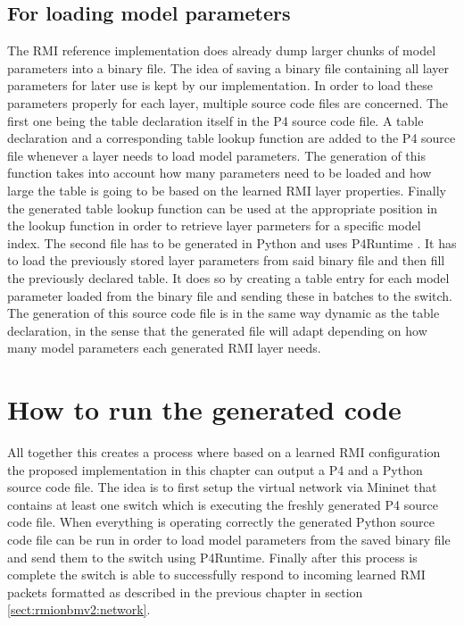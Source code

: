 \subsection{For loading model parameters}
\label{sect:rmiforp4:parameters}
The RMI reference implementation does already dump larger chunks of model parameters into a binary file. The idea of saving a binary file containing all layer parameters for later use is kept by our implementation. In order to load these parameters properly for each layer, multiple source code files are concerned. The first one being the table declaration itself in the P4 source code file. A table declaration and a corresponding table lookup function are added to the P4 source file whenever a layer needs to load model parameters. The generation of this function takes into account how many parameters need to be loaded and how large the table is going to be based on the learned RMI layer properties. Finally the generated table lookup function can be used at the appropriate position in the lookup function in order to retrieve layer parmeters for a specific model index. The second file has to be generated in Python and uses P4Runtime \cite{p4runtime-spec}. It has to load the previously stored layer parameters from said binary file and then fill the previously declared table. It does so by creating a table entry for each model parameter loaded from the binary file and sending these in batches to the switch. The generation of this source code file is in the same way dynamic as the table declaration, in the sense that the generated file will adapt depending on how many model parameters each generated RMI layer needs.

\section{How to run the generated code}
All together this creates a process where based on a learned RMI configuration the proposed implementation in this chapter can output a P4 and a Python source code file. The idea is to first setup the virtual network via Mininet that contains at least one switch which is executing the freshly generated P4 source code file. When everything is operating correctly the generated Python source code file can be run in order to load model parameters from the saved binary file and send them to the switch using P4Runtime. Finally after this process is complete the switch is able to successfully respond to incoming learned RMI packets formatted as described in the previous chapter in section \ref{sect:rmionbmv2:network}.

